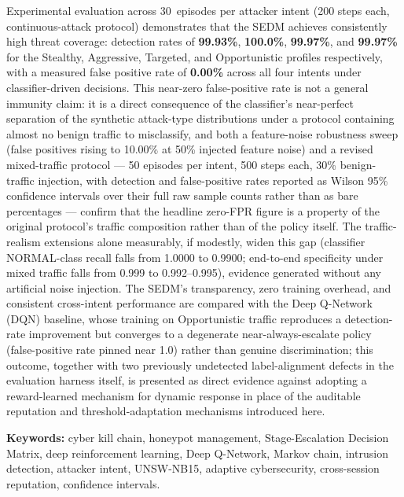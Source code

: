 Experimental evaluation across 30~episodes per attacker intent (200 steps
each, continuous-attack protocol) demonstrates that the SEDM achieves
consistently high threat coverage: detection rates of \textbf{99.93\%},
\textbf{100.0\%}, \textbf{99.97\%}, and \textbf{99.97\%} for the Stealthy,
Aggressive, Targeted, and Opportunistic profiles respectively, with a
measured false positive rate of \textbf{0.00\%} across all four intents
under classifier-driven decisions.
This near-zero false-positive rate is not a general immunity claim: it is a
direct consequence of the classifier's near-perfect separation of the
synthetic attack-type distributions under a protocol containing almost no
benign traffic to misclassify, and both a feature-noise robustness sweep
(false positives rising to 10.00\% at 50\% injected feature noise) and a
revised mixed-traffic protocol --- 50 episodes per intent, 500 steps each,
30\% benign-traffic injection, with detection and false-positive rates
reported as Wilson 95\% confidence intervals over their full raw sample
counts rather than as bare percentages --- confirm that the headline
zero-FPR figure is a property of the original protocol's traffic
composition rather than of the policy itself.
The traffic-realism extensions alone measurably, if modestly, widen this
gap (classifier NORMAL-class recall falls from 1.0000 to 0.9900; end-to-end
specificity under mixed traffic falls from 0.999 to 0.992--0.995), evidence
generated without any artificial noise injection.
The SEDM's transparency, zero training overhead, and consistent cross-intent
performance are compared with the Deep Q-Network (DQN) baseline, whose
training on Opportunistic traffic reproduces a detection-rate improvement
but converges to a degenerate near-always-escalate policy (false-positive
rate pinned near 1.0) rather than genuine discrimination; this outcome,
together with two previously undetected label-alignment defects in the
evaluation harness itself, is presented as direct evidence against adopting
a reward-learned mechanism for dynamic response in place of the auditable
reputation and threshold-adaptation mechanisms introduced here.

\vspace{1em}
\noindent\textbf{Keywords:} cyber kill chain, honeypot management, Stage-Escalation
Decision Matrix, deep reinforcement learning, Deep Q-Network, Markov chain,
intrusion detection, attacker intent, UNSW-NB15, adaptive cybersecurity,
cross-session reputation, confidence intervals.
\clearpage
